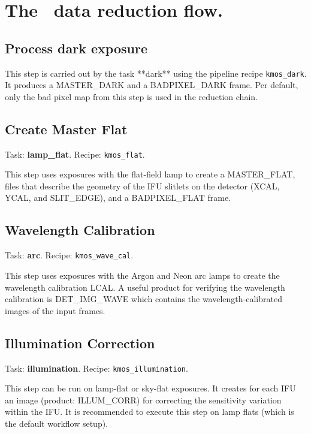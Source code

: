 \section{The \instname\ data reduction flow.}
\label{sec:reduction_flow}




\subsection{Process dark exposure}

This step is carried out by the task **dark** using the pipeline recipe {\tt kmos\_dark}. 
It produces a MASTER\_DARK and a BADPIXEL\_DARK frame. Per default, only the bad pixel map from this step
is used in the reduction chain.

\subsection{Create Master Flat}

Task: {\bf lamp\_flat}. Recipe: {\tt kmos\_flat}. 

This step uses exposures with the flat-field lamp to create a MASTER\_FLAT, files that describe the geometry 
of the IFU slitlets on the detector (XCAL, YCAL, and SLIT\_EDGE), and a BADPIXEL\_FLAT frame.

\subsection{Wavelength Calibration}

Task: {\bf arc}. Recipe: {\tt kmos\_wave\_cal}. 

This step uses exposures with the Argon and Neon arc lamps to create the wavelength calibration LCAL.
A useful product for verifying the wavelength calibration is DET\_IMG\_WAVE which contains the wavelength-calibrated
images of the input frames.

\subsection{Illumination Correction}

Task: {\bf illumination}. Recipe: {\tt kmos\_illumination}. 

This step can be run on lamp-flat or sky-flat exposures. It creates
for each IFU an image (product: ILLUM\_CORR) for correcting the
sensitivity variation within the IFU. It is recommended to execute
this step on lamp flats (which is the default workflow setup).

